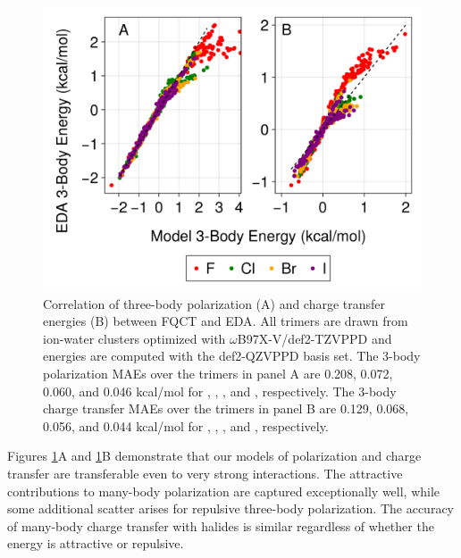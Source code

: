 \documentclass[journal=jctcce,manuscript=article]{achemso}
\begin{document}
\begin{figure}[h]
  \includegraphics*[width=\textwidth]{figures/three_body_pol_and_ct_halides.png}
  \caption{Correlation of three-body polarization (A) and charge transfer energies (B)
  between FQCT and EDA. All trimers are drawn from ion-water clusters optimized
  with $\omega$B97X-V/def2-TZVPPD and energies are computed with the def2-QZVPPD basis set.
  The 3-body polarization MAEs over the trimers in panel A are 0.208, 0.072, 0.060, and 0.046 kcal/mol
  for , , , and , respectively. The 3-body charge transfer MAEs over
  the trimers in panel B are 0.129, 0.068, 0.056, and 0.044 kcal/mol
  for , , , and , respectively.
}
  \label{fig:halide_3b}
\end{figure}

Figures \ref{fig:halide_3b}A and \ref{fig:halide_3b}B demonstrate that our models of polarization and charge transfer are transferable even to very strong interactions. The attractive contributions to many-body polarization are captured exceptionally well, while some additional scatter arises for repulsive three-body polarization. The accuracy of many-body charge transfer with halides is similar regardless of whether the energy is attractive or repulsive. 
\end{document}
